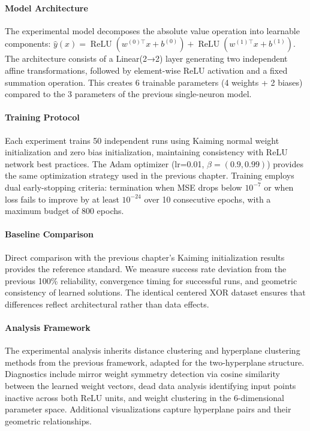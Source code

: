 \paragraph{Model Architecture}
The experimental model decomposes the absolute value operation into learnable components: $\hat{y}(x) = \operatorname{ReLU}(w^{(0)\top}x + b^{(0)}) + \operatorname{ReLU}(w^{(1)\top}x + b^{(1)})$. The architecture consists of a Linear(2→2) layer generating two independent affine transformations, followed by element-wise ReLU activation and a fixed summation operation. This creates 6 trainable parameters (4 weights + 2 biases) compared to the 3 parameters of the previous single-neuron model.

\paragraph{Training Protocol}
Each experiment trains 50 independent runs using Kaiming normal weight initialization and zero bias initialization, maintaining consistency with ReLU network best practices. The Adam optimizer (lr=0.01, $\beta = (0.9, 0.99)$) provides the same optimization strategy used in the previous chapter. Training employs dual early-stopping criteria: termination when MSE drops below $10^{-7}$ or when loss fails to improve by at least $10^{-24}$ over 10 consecutive epochs, with a maximum budget of 800 epochs.

\paragraph{Baseline Comparison}
Direct comparison with the previous chapter's Kaiming initialization results provides the reference standard. We measure success rate deviation from the previous 100\% reliability, convergence timing for successful runs, and geometric consistency of learned solutions. The identical centered XOR dataset ensures that differences reflect architectural rather than data effects.

\paragraph{Analysis Framework}
The experimental analysis inherits distance clustering and hyperplane clustering methods from the previous framework, adapted for the two-hyperplane structure. Diagnostics include mirror weight symmetry detection via cosine similarity between the learned weight vectors, dead data analysis identifying input points inactive across both ReLU units, and weight clustering in the 6-dimensional parameter space. Additional visualizations capture hyperplane pairs and their geometric relationships.

